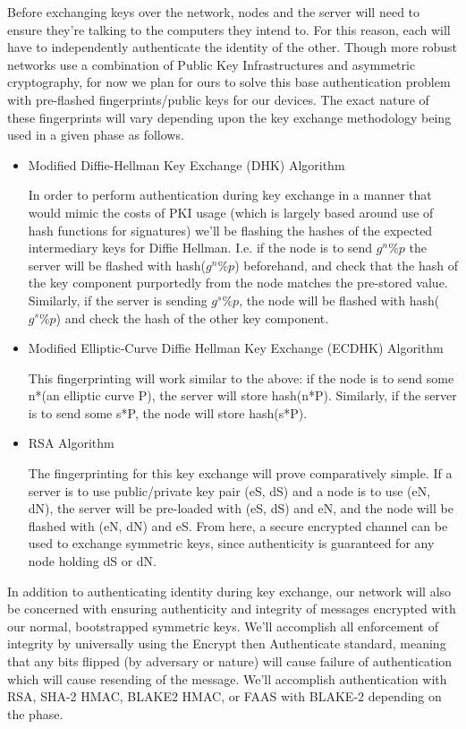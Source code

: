 \documentclass[tikz,a4paper,titlepage]{article}
\begin{document}

Before exchanging keys over the network, nodes and the server will need to ensure they're talking to the computers they intend to. For this reason, each will have to independently authenticate the identity of the other. Though more robust networks use a combination of Public Key Infrastructures and asymmetric cryptography, for now we plan for ours to solve this base authentication problem with pre-flashed fingerprints/public keys for our devices. The exact nature of these fingerprints will vary depending upon the key exchange methodology being used in a given phase as follows.
\begin{itemize}
    \item Modified Diffie-Hellman Key Exchange (DHK) Algorithm
    
    In order to perform authentication during key exchange in a manner that would mimic the costs of PKI usage (which is largely based around use of hash functions for signatures) we'll be flashing the hashes of the expected intermediary keys for Diffie Hellman. I.e. if the node is to send $g^n \%p$ the server will be flashed with hash($g^n\%p$) beforehand, and check that the hash of the key component purportedly from the node matches the pre-stored value. Similarly, if the server is sending $g^s \%p$, the node will be flashed with hash($g^s \%p$) and check the hash of the other key component.
    \item Modified Elliptic-Curve Diffie Hellman Key Exchange (ECDHK) Algorithm
    
    This fingerprinting will work similar to the above: if the node is to send some n*(an elliptic curve P), the server will store hash(n*P). Similarly, if the server is to send some s*P, the node will store hash(s*P).
    \item RSA Algorithm
    
    The fingerprinting for this key exchange will prove comparatively simple. If a server is to use public/private key pair (eS, dS) and a node is to use (eN, dN), the server will be pre-loaded with (eS, dS) and eN, and the node will be flashed with (eN, dN) and eS. From here, a secure encrypted channel can be used to exchange symmetric keys, since authenticity is guaranteed for any node holding dS or dN.
    
\end{itemize}

In addition to authenticating identity during key exchange, our network will also be concerned with ensuring authenticity and integrity of messages encrypted with our normal, bootstrapped symmetric keys. We'll accomplish all enforcement of integrity by universally using the Encrypt then Authenticate standard, meaning that any bits flipped (by adversary or nature) will cause failure of authentication which will cause resending of the message. We'll accomplish authentication with RSA, SHA-2 HMAC, BLAKE2 HMAC, or FAAS with BLAKE-2 depending on the phase. 
\end{document}
